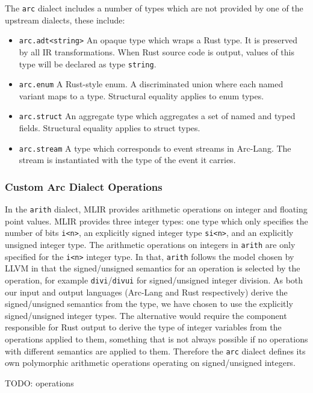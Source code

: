 The \texttt{arc} dialect includes a number of types which are not provided by one of the upstream dialects, these include:
\begin{itemize}
  \item \texttt{arc.adt<string>} An opaque type which wraps a Rust type. It is preserved by all IR transformations. When Rust source code is output, values of this type will be declared as type \texttt{string}.
  \item \texttt{arc.enum} A Rust-style enum. A discriminated union where each named variant maps to a type. Structural equality applies to enum types.
  \item \texttt{arc.struct} An aggregate type which aggregates a set of named and typed fields. Structural equality applies to struct types.
  \item \texttt{arc.stream} A type which corresponds to event streams in Arc-Lang. The stream is instantiated with the type of the event it carries.
\end{itemize}

\subsubsection{Custom Arc Dialect Operations}

In the \texttt{arith} dialect, MLIR provides arithmetic operations on integer and floating point values. MLIR provides three integer types: one type which only specifies the number of bits \texttt{i<n>}, an explicitly signed integer type \texttt{si<n>}, and an explicitly unsigned integer type. The arithmetic operations on integers in \texttt{arith} are only specified for the \texttt{i<n>} integer type. In that, \texttt{arith} follows the model chosen by LLVM in that the signed/unsigned semantics for an operation is selected by the operation, for example \texttt{divi}/\texttt{divui} for signed/unsigned integer division. As both our input and output languages (Arc-Lang and Rust respectively) derive the signed/unsigned semantics from the type, we have chosen to use the explicitly signed/unsigned integer types. The alternative would require the component responsible for Rust output to derive the type of integer variables from the operations applied to them, something that is not always possible if no operations with different semantics are applied to them. Therefore the \texttt{arc} dialect defines its own polymorphic arithmetic operations operating on signed/unsigned integers.

TODO: operations

